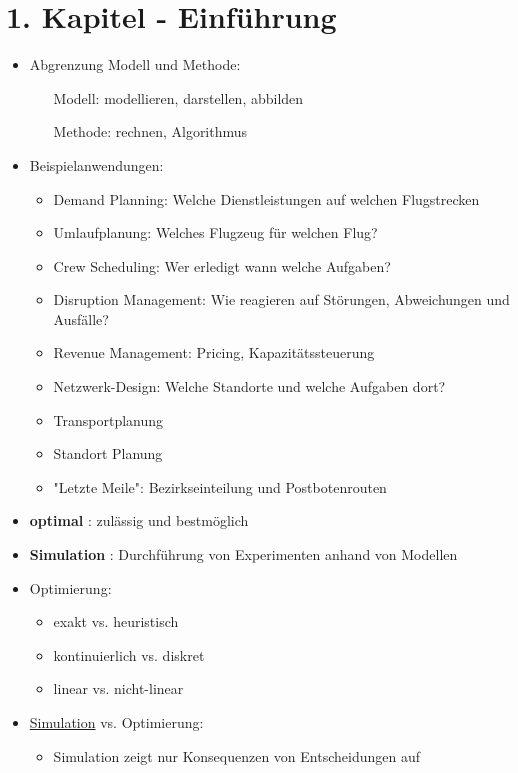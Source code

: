 \documentclass[12pt]{article}
\begin{document}
	\section{1. Kapitel - Einführung}
	\begin{itemize}
		\item Abgrenzung Modell und Methode:
			\begin{itemize}
				\item[Modell:] modellieren, darstellen, abbilden
				\item[Methode:] rechnen, Algorithmus
			\end{itemize}
		\item Beispielanwendungen:
			\begin{itemize}
				\item Demand Planning: Welche Dienstleistungen auf welchen Flugstrecken
				\item Umlaufplanung: Welches Flugzeug für welchen Flug?
				\item Crew Scheduling: Wer erledigt wann welche Aufgaben?
				\item Disruption Management: Wie reagieren auf Störungen, Abweichungen und Ausfälle?
				\item Revenue Management: Pricing, Kapazitätssteuerung
				\item Netzwerk-Design: Welche Standorte und welche Aufgaben dort?
				\item Transportplanung
				\item Standort Planung
				\item "Letzte Meile": Bezirkseinteilung und Postbotenrouten
			\end{itemize}
		\item \textbf{optimal} \label{optimal}\label{Optimum}: zulässig und bestmöglich
		\item \textbf{Simulation} \label{Simulation}: Durchführung von Experimenten anhand von Modellen
		\item Optimierung:
			\begin{itemize}
				\item exakt vs. heuristisch
				\item kontinuierlich vs. diskret
				\item linear vs. nicht-linear 
			\end{itemize}
		\item \hyperref[Simulation]{Simulation} vs. Optimierung:
			\begin{itemize}
				\item Simulation zeigt nur Konsequenzen von Entscheidungen auf

\end{itemize}
\end{itemize}
\end{document}
